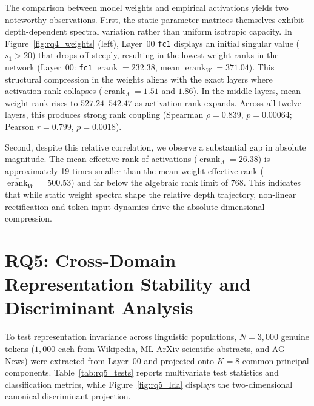 \documentclass[12pt, a4paper, oneside]{report}
\theoremstyle{definition}
\newcommand{\erank}{\operatorname{erank}}
\begin{document}
The comparison between model weights and empirical activations yields two noteworthy observations. First, the static parameter matrices themselves exhibit depth-dependent spectral variation rather than uniform isotropic capacity. In Figure~\ref{fig:rq4_weights} (left), Layer~00 \texttt{fc1} displays an initial singular value ($s_1 > 20$) that drops off steeply, resulting in the lowest weight ranks in the network (Layer~00: \texttt{fc1} $\erank = 232.38$, mean $\erank_W = 371.04$). This structural compression in the weights aligns with the exact layers where activation rank collapses ($\erank_A = 1.51$ and $1.86$). In the middle layers, mean weight rank rises to $527.24\text{--}542.47$ as activation rank expands. Across all twelve layers, this produces strong rank coupling (Spearman $\rho = 0.839$, $p = 0.00064$; Pearson $r = 0.799$, $p = 0.0018$).

Second, despite this relative correlation, we observe a substantial gap in absolute magnitude. The mean effective rank of activations ($\overline{\erank}_A = 26.38$) is approximately 19 times smaller than the mean weight effective rank ($\overline{\erank}_W = 500.53$) and far below the algebraic rank limit of $768$. This indicates that while static weight spectra shape the relative depth trajectory, non-linear rectification and token input dynamics drive the absolute dimensional compression.

\section{RQ5: Cross-Domain Representation Stability and Discriminant Analysis}

To test representation invariance across linguistic populations, $N = 3{,}000$ genuine tokens ($1{,}000$ each from Wikipedia, ML-ArXiv scientific abstracts, and AG-News) were extracted from Layer~00 and projected onto $K = 8$ common principal components. Table~\ref{tab:rq5_tests} reports multivariate test statistics and classification metrics, while Figure~\ref{fig:rq5_lda} displays the two-dimensional canonical discriminant projection.
\end{document}
